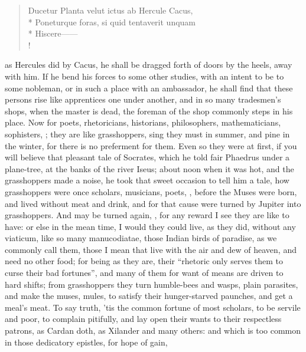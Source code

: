 \begin{latin}
\begin{verse}%
Ducetur Planta velut ictus ab Hercule Cacus,\\*
Poneturque foras, si quid tentaverit unquam\\*
Hiscere------\\!
\end{verse}%
\end{latin}
as Hercules did by Cacus, he shall be dragged forth of doors by the heels, away
with him. If he bend his forces to some other studies, with an intent to be
 to some nobleman, or in such a place with an ambassador, he
shall find that these persons rise like apprentices one under another, and in
so many tradesmen's shops, when the master is dead, the foreman of the shop
commonly steps in his place. Now for poets, rhetoricians, historians,
philosophers, mathematicians, sophisters, \etc{}; they are
like grasshoppers, sing they must in summer, and pine in the winter, for there
is no preferment for them. Even so they were at first, if you will believe that
pleasant tale of Socrates, which he told fair Phaedrus under a plane-tree, at
the banks of the river Iseus; about noon when it was hot, and the grasshoppers
made a noise, he took that sweet occasion to tell him a tale, how grasshoppers
were once scholars, musicians, poets, \etc{}, before the Muses were born, and
lived without meat and drink, and for that cause were turned by Jupiter into
grasshoppers. And may be turned again, , for any reward I see they are like to have: or else in the mean time, I
would they could live, as they did, without any viaticum, like so many
manucodiatae, those Indian birds of paradise, as we
commonly call them, those I mean that live with the air and dew of heaven, and
need no other food; for being as they are, their \enquote{rhetoric
only serves them to curse their bad fortunes}, and many of them for want of
means are driven to hard shifts; from grasshoppers they turn humble-bees and
wasps, plain parasites, and make the muses, mules, to satisfy their
hunger-starved paunches, and get a meal's meat. To say truth, 'tis the common
fortune of most scholars, to be servile and poor, to complain pitifully, and
lay open their wants to their respectless patrons, as
Cardan doth, as Xilander and many
others: and which is too common in those dedicatory epistles, for hope of gain,
